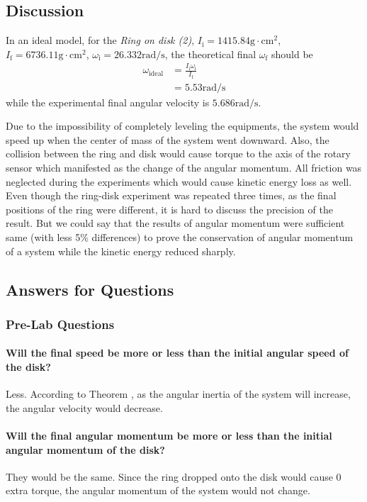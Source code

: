 \subsection{Discussion}
In an ideal model, for the \emph{Ring on disk (2)}, $I_{\text{i}}=1415.84\text{g}\cdot\text{cm}^2$, $I_{\text{f}}=6736.11\text{g}\cdot\text{cm}^2$, $\omega_{\text{i}}=26.332\text{rad/s}$, the theoretical final $\omega_{\text{f}}$ should be
\begin{equation*}
  \begin{aligned}
    \omega_{\text{ideal}} & =\frac{I_{\text{i}}\omega_{\text{i}}}{I_{\text{f}}} \\
                          & =5.53\text{rad/s}
  \end{aligned}
\end{equation*}
while the experimental final angular velocity is $5.686\text{rad/s}$.\par
Due to the impossibility of completely leveling the equipments, the system would speed up when the center of mass of the system went downward. Also, the collision between the ring and disk would cause torque to the axis of the rotary sensor which manifested as the change of the angular momentum. All friction was neglected during the experiments which would cause kinetic energy loss as well. Even though the ring-disk experiment was repeated three times, as the final positions of the ring were different, it is hard to discuss the precision of the result. But we could say that the results of angular momentum were sufficient same (with less 5\% differences) to
prove the conservation of angular momentum of a system while the kinetic energy reduced sharply.

\subsection{Answers for Questions}
\subsubsection{Pre-Lab Questions}
\paragraph{Will the final speed be more or less than the initial angular speed of the disk?}
Less. According to Theorem , as the angular inertia of the system will increase, the angular velocity would decrease.
\paragraph{Will the final angular momentum be more or less than the initial angular momentum of the disk?}They would be the same. Since the ring dropped onto the disk would cause 0 extra torque, the angular momentum of the system would not change.
